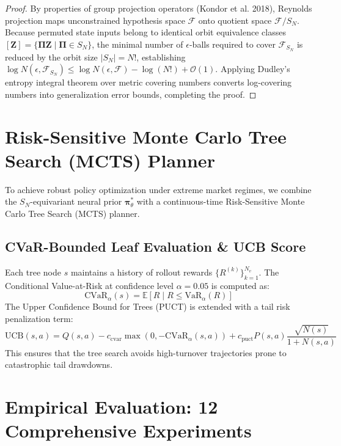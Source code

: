 \documentclass[11pt,a4paper]{article}
\theoremstyle{plain}
\theoremstyle{definition}
\theoremstyle{remark}
\begin{document}
\begin{proof}
By properties of group projection operators (Kondor et al. 2018), Reynolds projection maps unconstrained hypothesis space $\mathcal{F}$ onto quotient space $\mathcal{F} / S_N$. Because permuted state inputs belong to identical orbit equivalence classes $[\mathbf{Z}] = \{ \mathbf{\Pi}\mathbf{Z} \mid \mathbf{\Pi} \in S_N \}$, the minimal number of $\epsilon$-balls required to cover $\mathcal{F}_{S_N}$ is reduced by the orbit size $|S_N| = N!$, establishing $\log N(\epsilon, \mathcal{F}_{S_N}) \le \log N(\epsilon, \mathcal{F}) - \log(N!) + \mathcal{O}(1)$. Applying Dudley's entropy integral theorem over metric covering numbers converts log-covering numbers into generalization error bounds, completing the proof.
\end{proof}

\section{Risk-Sensitive Monte Carlo Tree Search (MCTS) Planner}

To achieve robust policy optimization under extreme market regimes, we combine the $S_N$-equivariant neural prior $\mathbf{\pi}_\theta^*$ with a continuous-time Risk-Sensitive Monte Carlo Tree Search (MCTS) planner.

\subsection{CVaR-Bounded Leaf Evaluation \& UCB Score}
Each tree node $s$ maintains a history of rollout rewards $\{R^{(k)}\}_{k=1}^{N_v}$. The Conditional Value-at-Risk at confidence level $\alpha = 0.05$ is computed as:
\begin{equation}
    \text{CVaR}_\alpha(s) = \mathbb{E}\left[ R \mid R \le \text{VaR}_\alpha(R) \right]
\end{equation}
The Upper Confidence Bound for Trees (PUCT) is extended with a tail risk penalization term:
\begin{equation}
    \text{UCB}(s, a) = Q(s, a) - c_{\text{cvar}} \max\left(0, -\text{CVaR}_\alpha(s, a)\right) + c_{\text{puct}} P(s, a) \frac{\sqrt{N(s)}}{1 + N(s, a)}
\end{equation}
This ensures that the tree search avoids high-turnover trajectories prone to catastrophic tail drawdowns.

\section{Empirical Evaluation: 12 Comprehensive Experiments}
\end{document}
